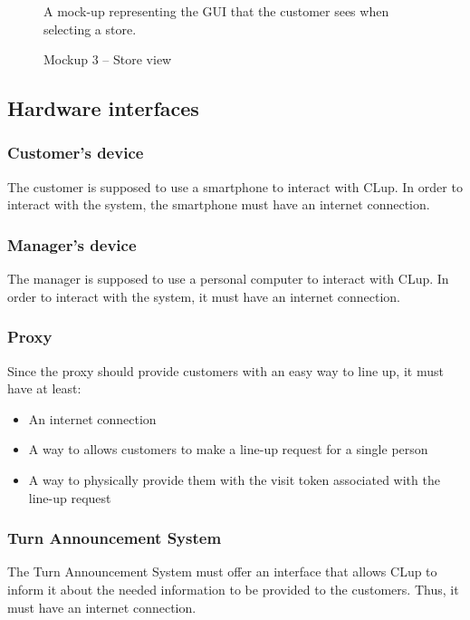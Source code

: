 \documentclass[a4paper,oneside,11pt]{book}   %
\newcommand{\captionrasd}[2]{\caption{#1}\par\begin{center}\vspace{-.01\textheight}\small#2.\end{center}}
\begin{document}
\begin{figure}[H]
\begin{minipage}[b]{0.418\textwidth}
            \captionrasd{Mockup 3 -- Store view}{A mock-up representing the GUI that the customer sees when selecting a store}
            \vspace{-0.085cm}
        \end{minipage}
        \hspace{0.025\textwidth}
    \end{figure}

    \subsection{Hardware interfaces}
    \subsubsection{Customer's device} 
    The customer is supposed to use a smartphone to interact with CLup. In order to interact with the system, the smartphone must have an internet connection.
    
    \subsubsection{Manager's device} 
    The manager is supposed to use a personal computer to interact with CLup. In order to interact with the system, it must have an internet connection.
    
    \subsubsection{Proxy} 
    Since the proxy should provide customers with an easy way to line up, it must have at least:
    \begin{itemize}
        \item An internet connection
        \item A way to allows customers to make a line-up request for a single person
        \item A way to physically provide them with the visit token associated with the line-up request
    \end{itemize}
    
    \subsubsection{Turn Announcement System}
    The Turn Announcement System must offer an interface that allows CLup to inform it about the needed information to be provided to the customers. Thus, it must have an internet connection.
    
\end{document}
